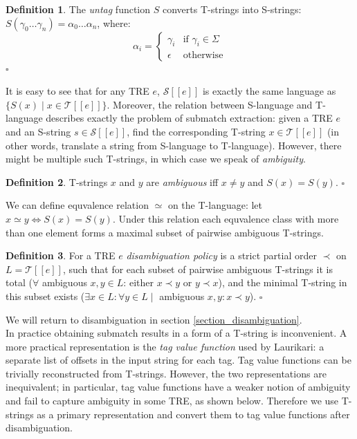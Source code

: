 \documentclass{article}
\newcommand{\Xin}{\!\in\!}
\newcommand{\Xeq}{\!=\!}
\newcommand{\Xlb}{[\![}
\newcommand{\Xrb}{]\!]}
\newcommand{\XS}{\mathcal{S}}
\newcommand{\XT}{\mathcal{T}}
\theoremstyle{definition}
\newtheorem{Xdef}{Definition}
\begin{document}
\begin{multicols}{2}
    \begin{Xdef}\label{untag}
    The \emph{untag} function $S$ converts T-strings into S-strings:
    $S(\gamma_0 \dots \gamma_n) \Xeq \alpha_0 \dots \alpha_n$, where:
    $$\alpha_i = \begin{cases}
            \gamma_i &\text{if } \gamma_i \Xin \Sigma \\[-0.5em]
            \epsilon &\text{otherwise}
        \end{cases}$$
    $\square$
    \end{Xdef}

It is easy to see that for any TRE $e$, $\XS \Xlb e \Xrb$
is exactly the same language as $\{S(x) \mid x \Xin \XT \Xlb e \Xrb\}$.
Moreover, the relation between S-language and T-language
describes exactly the problem of submatch extraction:
given a TRE $e$ and an S-string $s \Xin \XS \Xlb e \Xrb$,
find the corresponding T-string $x \Xin \XT \Xlb e \Xrb$
(in other words, translate a string from S-language to T-language).
However, there might be multiple such T-strings, in which case we speak of \emph{ambiguity}.

    \begin{Xdef}
    T-strings $x$ and $y$ are \emph{ambiguous} iff $x \!\neq\! y$ and $S(x) \Xeq S(y)$.
    $\square$
    \end{Xdef}

We can define equvalence relation $\simeq$ on the T-language: let $x \simeq y \Leftrightarrow S(x) \Xeq S(y)$.
Under this relation each equvalence class with more than one element forms a maximal subset of pairwise ambiguous T-strings.

    \begin{Xdef}
    For a TRE $e$ \emph{disambiguation policy} is a strict partial order $\prec$ on $L \Xeq \XT \Xlb e \Xrb$, such that
    for each subset of pairwise ambiguous T-strings
    it is total ($\forall$ ambiguous $x, y \Xin L$: either $x \prec y$ or $y \prec x$),
    and the minimal T-string in this subset exists ($\exists x \Xin L: \forall y \Xin L \mid$ ambiguous $x, y: x \prec y$).
    $\square$
    \end{Xdef}

We will return to disambiguation in section \ref{section_disambiguation}.
\\

In practice obtaining submatch results in a form of a T-string is inconvenient.
A more practical representation is the \emph{tag value function} used by Laurikari: 
a separate list of offsets in the input string for each tag.
Tag value functions can be trivially reconstructed from T-strings.
However, the two representations are inequivalent;
in particular, tag value functions have a weaker notion of ambiguity and fail to capture ambiguity in some TRE, as shown below.
Therefore we use T-strings as a primary representation
and convert them to tag value functions after disambiguation.


\end{multicols}
\end{document}

